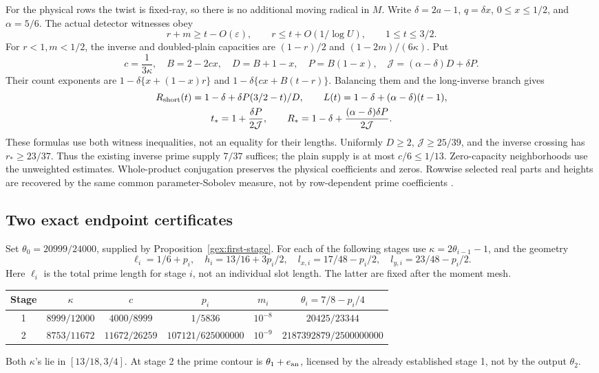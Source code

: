 For the physical rows the twist is fixed-ray, so there is no additional
moving radical in \(M\). Write \(\delta=2a-1\), \(q=\delta x\),
\(0\le x\le1/2\), and \(\alpha=5/6\). The actual detector witnesses obey
\[
 r+m\ge t-O(\varepsilon),\qquad r\le t+O(1/\log U),
 \qquad 1\le t\le3/2.
\]
For \(r<1,m<1/2\), the inverse and doubled-plain capacities are
\((1-r)/2\) and \((1-2m)/(6\kappa)\). Put
\[
 c=\frac1{3\kappa},\quad B=2-2cx,\quad
 D=B+1-x,\quad P=B(1-x),\quad
 \mathcal J=(\alpha-\delta)D+\delta P.
\]
Their count exponents are
\(1-\delta\{x+(1-x)r\}\) and
\(1-\delta\{cx+B(t-r)\}\). Balancing them and the long-inverse
branch gives
\begin{equation}\label{gex:adaptive-count}
\begin{gathered}
 R_{\rm short}(t)=1-\delta+\delta P(3/2-t)/D,\qquad
 L(t)=1-\delta+(\alpha-\delta)(t-1),\\
 t_*=1+\frac{\delta P}{2\mathcal J},\qquad
 R_*=1-\delta+\frac{(\alpha-\delta)\delta P}{2\mathcal J}.
\end{gathered}
\end{equation}
These formulas use both witness inequalities, not an equality for their
lengths. Uniformly \(D\ge2\), \(\mathcal J\ge25/39\), and the inverse
crossing has \(r_*\ge23/37\). Thus the existing inverse prime supply
\(7/37\) suffices; the plain supply is at most \(c/6\le1/13\).
Zero-capacity neighborhoods use the unweighted estimates.
Whole-product conjugation preserves the physical coefficients and zeros.
Rowwise selected real parts and heights are recovered by the same common
parameter-Sobolev measure, not by row-dependent prime coefficients
\cite[Proposition 4.1]{GaoAdaptive26}.

\subsection{Two exact endpoint certificates}

Set \(\theta_0=20999/24000\), supplied by
Proposition~\ref{gex:first-stage}. For each of the following stages use
\(\kappa=2\theta_{i-1}-1\), and the geometry
\[
 \ell_i=1/6+p_i,\quad h_i=13/16+3p_i/2,\quad
 l_{x,i}=17/48-p_i/2,\quad l_{y,i}=23/48-p_i/2.
\]
Here \(\ell_i\) is the total prime length for stage \(i\), not an
individual slot length. The latter are fixed after the moment mesh.
\begin{center}
\small
\begin{tabular}{@{}cccccc@{}}
\toprule
Stage & \(\kappa\) & \(c\) & \(p_i\) & \(m_i\) & \(\theta_i=7/8-p_i/4\)\\
\midrule
1 & \(8999/12000\) & \(4000/8999\) & \(1/5836\)
  & \(10^{-8}\) & \(20425/23344\)\\
2 & \(8753/11672\) & \(11672/26259\) & \(107121/625000000\)
  & \(10^{-9}\) & \(2187392879/2500000000\)\\
\bottomrule
\end{tabular}
\end{center}
Both \(\kappa\)'s lie in \([13/18,3/4]\). At stage 2 the prime contour
is \(\theta_1+e_{\rm an}\), licensed by the already established stage 1,
not by the output \(\theta_2\).

